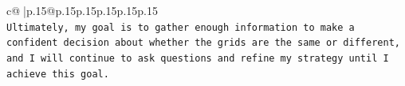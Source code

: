\documentclass{article}
\begin{document}
{\begin{supertabular}{c@{$\;$}|p{.15\linewidth}@{}p{.15\linewidth}p{.15\linewidth}p{.15\linewidth}p{.15\linewidth}p{.15\linewidth}}
{{{\\ 
\texttt{Ultimately, my goal is to gather enough information to make a confident decision about whether the grids are the same or different, and I will continue to ask questions and refine my strategy until I achieve this goal.} \\
            }
        }
    }
     \\ \\

\end{supertabular}
}
\end{document}
